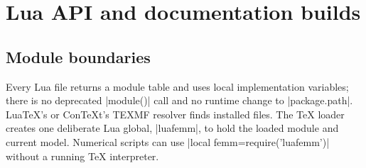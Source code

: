 \section{Lua API and documentation builds}
\label{sec:development}
\subsection{Module boundaries}
Every Lua file returns a module table and uses local implementation
variables; there is no deprecated |module()| call and no runtime change
to |package.path|. LuaTeX's or ConTeXt's TEXMF resolver finds installed
files. The TeX loader creates one deliberate Lua global, |luafemm|, to
hold the loaded module and current model. Numerical scripts can use
|local femm=require('luafemm')| without a running TeX interpreter.

